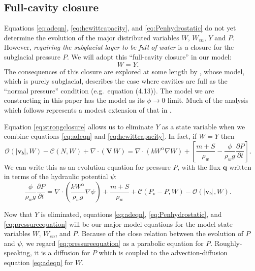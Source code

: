 \documentclass[11pt,final]{amsart}
\newcommand\bv{\mathbf{v}}
\newcommand\bV{\mathbf{V}}
\newcommand\bq{\mathbf{q}}
\newcommand{\Div}{\nabla\cdot}
\newcommand{\grad}{\nabla}
\begin{document}
\subsection*{Full-cavity closure}  Equations  \eqref{eq:adeqn}, \eqref{eq:hewittcapacity}, and \eqref{eq:Penhydrostatic} do not yet determine the evolution of the major distributed variables $W$, $W_{en}$, $Y$ and $P$.  However, \emph{requiring the subglacial layer to be full of water} is a closure for the subglacial pressure $P$.  We will adopt this ``full-cavity closure'' in our model:
\begin{equation}
W = Y.\label{eq:strongclosure}
\end{equation}
The consequences of this closure are explored at some length by \cite{Schoofetal2012}, whose model, which is purely subglacial, describes the case where cavities are full as the ``normal pressure'' condition (e.g.~equation (4.13)).  The model we are constructing in this paper has the \cite{Schoofetal2012} model as its $\phi\to 0$ limit.    Much of the analysis which follows represents a modest extension of that in \cite{Schoofetal2012}.

Equation \eqref{eq:strongclosure} allows us to eliminate $Y$ as a state variable when we combine equations \eqref{eq:adeqn} and \eqref{eq:hewittcapacity}.  In fact, if $W=Y$ then
\begin{equation}
\mathcal{O}(|\bv_b|,W) - \mathcal{C}(N,W) + \Div\left(\bV\, W\right) = \Div \left(k W^\alpha \grad W\right) + \left[\frac{m+S}{\rho_w} - \frac{\phi}{\rho_w g}\frac{\partial P}{\partial t}\right]. \label{eq:initialformpressure}
\end{equation}
We can write this as an evolution equation for pressure $P$, with the flux $\bq$ written in terms of the hydraulic potential $\psi$:
\begin{equation}
\frac{\phi}{\rho_w g}\frac{\partial P}{\partial t} = \Div\left(\frac{k W^\alpha}{\rho_w g} \grad \psi\right) + \frac{m+S}{\rho_w} + \mathcal{C}(P_o-P,W) - \mathcal{O}(|\bv_b|,W). \label{eq:pressureequation}
\end{equation}

Now that $Y$ is eliminated, equations \eqref{eq:adeqn}, \eqref{eq:Penhydrostatic}, and \eqref{eq:pressureequation} will be our major model equations for the model state variables $W$, $W_{en}$, and $P$.  Because of the close relation between the evolution of $P$ and $\psi$, we regard \eqref{eq:pressureequation} as a parabolic equation for $P$.  Roughly-speaking, it is a diffusion for $P$ which is coupled to the advection-diffusion equation \eqref{eq:adeqn} for $W$.
\end{document}
